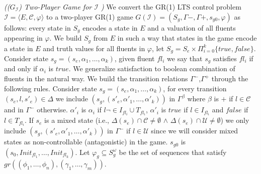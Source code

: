 %

\begin{definition}\label{def:lts-2-game}\emph{(($G_{\mathcal{I}}$) Two-Player Game for $\mathcal{I}$ )}
We convert the GR(1) LTS control problem $\mathcal{I}=\langle E, \mathcal{C}, \varphi \rangle$ to a two-player GR(1) game $G (\mathcal{I})=(S_{g},\Gamma{-},\Gamma{+},s_{g0},\varphi)$ as follows: every state in $S_{g}$ encodes a state in $E$ and a valuation of all fluents
appearing in $\varphi$. We build $S_g$ from $E$ in such a way that states in the game encode a state in $E$ and truth values for all fluents in $\varphi$, let $S_g = S_e \times \Pi_{i=0}^{k}\{true,false\}$.  Consider state $s_g=(s_e,\alpha_1,\ldots,\alpha_k)$, given fluent $fl_i$ we say that $s_g$ satisfies $fl_i$ if and only if $\alpha_i$ is $true$. We generalize satisfaction to boolean combination of fluents in the natural way.  We build the transition relations $\Gamma^{-}$,$\Gamma^{+}$ through the following rules.  Consider state $s_g=(s_e,\alpha_1,\ldots,\alpha_k)$, for every transition $(s_e,l,s'_e) \in \Delta$ we include $(s_g,(s'_e,\alpha'_1,\ldots,\alpha'_k))$ in $\Gamma^{\beta}$ where
$\beta$ is $+$ if $l \in \mathcal{C}$ and in $\Gamma^{-}$ otherwise.
$\alpha'_i$ is $\alpha_i$ if $l \neg\in I_{fl_i} \cup T_{fl_i}$, $\alpha'_i$ is $true$ if $l \in I_{fl_i}$ and $false$ if $l \in T_{fl_i}$.  
If $s_e$ is a mixed state (i.e., $\Delta(s_e) \cap \mathcal{C} \neq \emptyset$
$\wedge$
$\Delta(s_e) \cap \mathcal{U} \neq \emptyset$) we only include
$(s_g, (s'_e,\alpha'_1,\ldots,\alpha'_k))$ in $\Gamma^{-}$
if $l \in \mathcal{U}$ since we will consider mixed states as 
non-controllable (antagonistic) in the game.
$s_{g0}$ is $(s_0, Init_{fl_1},\ldots, Init_{fl_k})$.
Let $\varphi_g \subseteq S_g^{\omega}$ be the set of sequences that satisfy $gr((\phi_1,\ldots,\phi_n),(\gamma_1,\ldots,\gamma_m))$.
\end{definition}

